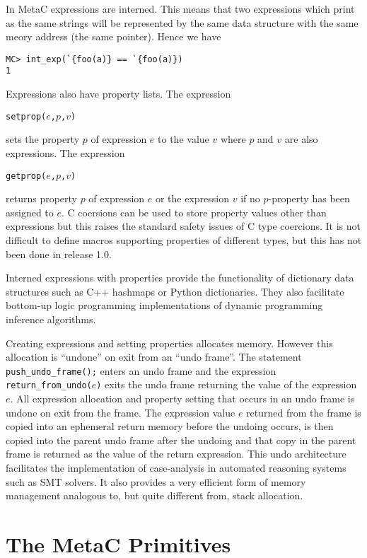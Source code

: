 \documentclass{article}
\begin{document}
In MetaC expressions are interned.  This means that two expressions which print as the same strings will be represented by the same data structure with the same meory address (the same pointer).
Hence we have

\begin{verbatim}
MC> int_exp(`{foo(a)} == `{foo(a)})
1
\end{verbatim}

Expressions also have property lists.  The expression

\centerline{\tt setprop($e$,$p$,$v$)}

sets the property $p$ of expression $e$ to the value $v$ where $p$ and $v$ are also expressions.
The expression

\centerline{\tt getprop($e$,$p$,$v$)}

returns property $p$ of expression $e$ or the expression $v$ if no $p$-property has been assigned to $e$.
C coersions can be used to store property values other than expressions
but this raises the standard safety issues of C type coercions.  It is not difficult to define macros supporting properties of different types, but this has not been done in release 1.0.

Interned expressions with properties provide the functionality of dictionary data structures such as C++ hashmaps or Python dictionaries.
They also facilitate bottom-up logic programming implementations of dynamic programming inference algorithms.

 Creating expressions and setting properties allocates memory.  However this allocation is ``undone'' on exit from an ``undo frame''.
The statement {\tt push\_undo\_frame();} enters an undo frame and the expression {\tt return\_from\_undo($e$)} exits the undo frame returning the value
of the expression $e$.  All expression allocation and property setting that occurs in an undo frame is undone on exit from the frame.  The expression value $e$
returned from the frame is copied into an ephemeral return memory before the undoing occurs, is then copied into the parent undo frame after the undoing
and that copy in the parent frame is returned as the value of the return expression.  This undo architecture facilitates the implementation of case-analysis
in automated reasoning systems such as SMT solvers.  It also provides a very efficient form of memory management analogous to, but quite different from,
stack allocation.

\section{The MetaC Primitives}
\end{document}

